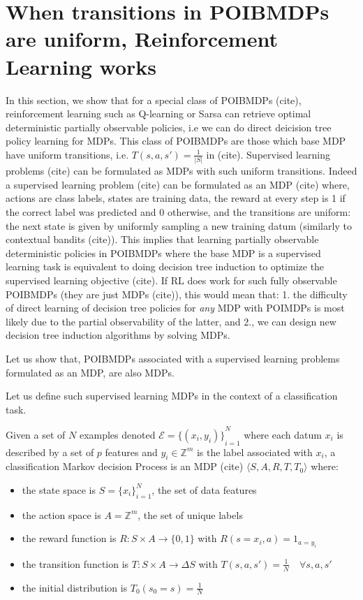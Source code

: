 \chapter{When transitions in POIBMDPs are uniform, Reinforcement Learning works}
In this section, we show that for a special class of POIBMDPs (cite), reinforcement learning such as Q-learning or Sarsa can retrieve optimal deterministic partially observable policies, i.e we can do direct deicision tree policy learning for MDPs.
This class of POIBMDPs are those which base MDP have uniform transitions, i.e. $T(s, a, s') = \frac{1}{|S|}$ in (cite).
Supervised learning problems (cite) can be formulated as MDPs with such uniform transitions.
Indeed a supervised learning problem (cite) can be formulated as an MDP (cite) where, actions are class labels, states are training data, the reward at every step is 1 if the correct label was predicted and 0 otherwise, and the transitions are uniform: the next state is given by uniformly sampling a new training datum (similarly to contextual bandits (cite)). 
This implies that learning partially observable deterministic policies in POIBMDPs where the base MDP is a supervised learning task is equivalent to doing decision tree induction to optimize the supervised learning objective (cite).
If RL does work for such fully observable POIBMDPs (they are just MDPs (cite)), this would mean that: 1. the difficulty of direct learning of decision tree policies for \textit{any} MDP with POIMDPs is most likely due to the partial observability of the latter, and 2., we can design new decision tree induction algorithms by solving MDPs.

Let us show that, POIBMDPs associated with a supervised learning problems formulated as an MDP, are also MDPs.

Let us define such supervised learning MDPs in the context of a classification task.
\begin{definition}
    Given a set of $N$ examples denoted $\mathcal{E} = {\{(x_i, y_i)\}}_{i=1}^N$ where each datum $x_i$ is described by a set of $p$ features and $y_i \in \mathbb{Z}^m$ is the label associated with $x_i$, a classification Markov decision Process is an MDP (cite) $\langle S, A, R, T, T_0 \rangle$ where:
    \begin{itemize}
        \item the state space is $S={\{x_i\}}_{i=1}^N$, the set of data features
        \item the action space is $A=\mathbb{Z}^m$, the set of unique labels
        \item the reward function is $R:S\times A \rightarrow \{0, 1\}$ with $R(s=x_i, a) = 1_{a=y_i}$
        \item the transition function is $T:S\times A \rightarrow \Delta S$ with $T(s, a, s') = \frac{1}{N} \quad \forall s, a, s'$
        \item the initial distribution is $T_0(s_0 = s) = \frac{1}{N}$
    \end{itemize}
\end{definition}

